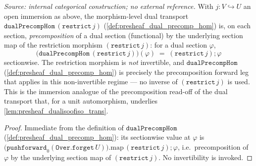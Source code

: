 \begin{lemma}

  \label{lem:dual_precomp_hom_restrict_apply}
  \textit{Source: internal categorical construction; no external reference.}
  With \(j : V \hookrightarrow U\) an open immersion as above, the morphism-level dual transport
  \(\mathtt{dualPrecompHom}\,(\mathtt{restrict}\,j)\) (\cref{def:presheaf_dual_precomp_hom}) is, on
  each section, \emph{precomposition} of a dual section (functional) by the underlying section map of
  the restriction morphism \((\mathtt{restrict}\,j)\): for a dual section \(\varphi\),
  \[
    \bigl(\mathtt{dualPrecompHom}\,(\mathtt{restrict}\,j)\bigr)(\varphi)
      \;=\; (\mathtt{restrict}\,j) \mathbin{;} \varphi
  \]
  sectionwise. The restriction morphism is \emph{not} invertible, and
  \(\mathtt{dualPrecompHom}\) (\cref{def:presheaf_dual_precomp_hom}) is precisely the precomposition
  forward leg that applies in this non-invertible regime --- no inverse of \((\mathtt{restrict}\,j)\)
  is used. This is the immersion analogue of the precomposition read-off of the dual transport that,
  for a unit automorphism, underlies \cref{lem:presheaf_dualisoofiso_trans}.
\end{lemma}
\begin{proof}
  \leanok
  Immediate from the definition of \(\mathtt{dualPrecompHom}\)
  (\cref{def:presheaf_dual_precomp_hom}): its sectionwise value at \(\varphi\) is
  \(\bigl(\mathtt{pushforward}_0(\mathtt{Over.forget}\,U)\bigr).\mathrm{map}\,(\mathtt{restrict}\,j)
  \mathbin{;} \varphi\), i.e.\ precomposition of \(\varphi\) by the underlying section map of
  \((\mathtt{restrict}\,j)\). No invertibility is invoked.
\end{proof}

